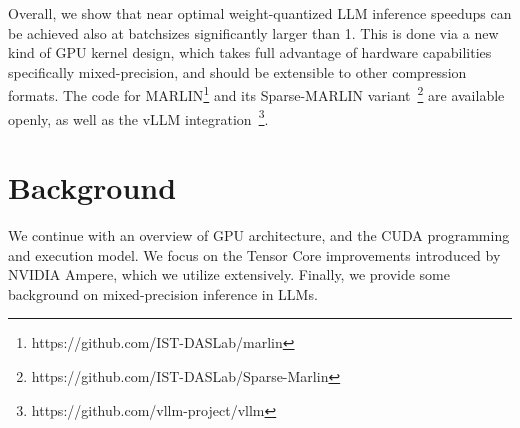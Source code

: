 \documentclass{article}
\theoremstyle{plain}
\theoremstyle{definition}
\theoremstyle{remark}
\begin{document}

Overall, we show that near optimal weight-quantized LLM inference speedups can be achieved also at batchsizes significantly larger than 1. This is done via a new kind of GPU kernel design, which takes full advantage of hardware capabilities specifically mixed-precision, and should be extensible to other compression formats. The code for MARLIN\footnote{https://github.com/IST-DASLab/marlin} and its Sparse-MARLIN variant~\footnote{https://github.com/IST-DASLab/Sparse-Marlin} are available openly, as well as the vLLM integration~\footnote{https://github.com/vllm-project/vllm}.  
















































\section{Background}

We continue with an overview of GPU architecture, and the CUDA programming and execution model. We  focus on the Tensor Core improvements introduced by NVIDIA Ampere, which we utilize extensively. Finally, we provide some background on mixed-precision inference in LLMs.
\end{document}
